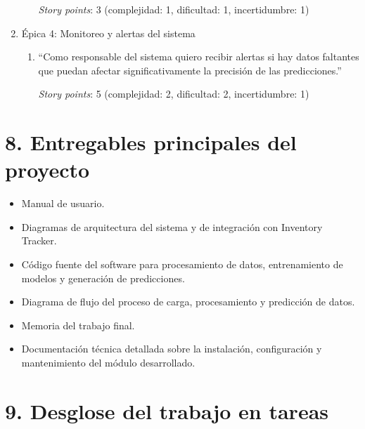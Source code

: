 \documentclass[
11pt, %
]{charter}
\begin{document}
\begin{enumerate}
\begin{enumerate}
		\textit{Story points}: 3 (complejidad: 1, dificultad: 1, incertidumbre: 1)

	\end{enumerate}
	\item Épica 4: Monitoreo y alertas del sistema
	\begin{enumerate}
		\item “Como responsable del sistema quiero recibir alertas si hay datos faltantes que puedan afectar significativamente la precisión de las predicciones.”

		\textit{Story points}: 5 (complejidad: 2, dificultad: 2, incertidumbre: 1)
	\end{enumerate}
\end{enumerate}

\section{8. Entregables principales del proyecto}
\label{sec:entregables}

\begin{itemize}
	\item Manual de usuario.
	\item Diagramas de arquitectura del sistema y de integración con Inventory Tracker.
	\item Código fuente del software para procesamiento de datos, entrenamiento de modelos y generación de predicciones.
	\item Diagrama de flujo del proceso de carga, procesamiento y predicción de datos.
	\item Memoria del trabajo final.
	\item Documentación técnica detallada sobre la instalación, configuración y mantenimiento del módulo desarrollado.
\end{itemize}

\section{9. Desglose del trabajo en tareas}
\label{sec:wbs}
\end{document}
